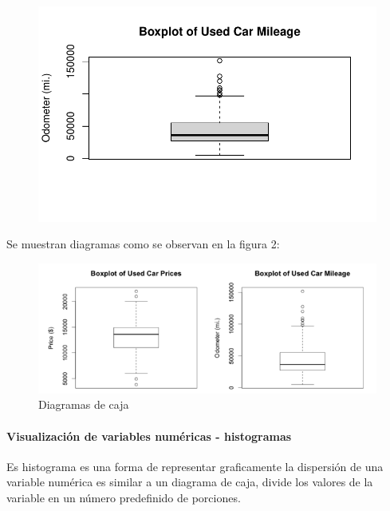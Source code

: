 \documentclass[
  letterpaper,
  DIV=11,
  numbers=noendperiod]{scrartcl}
\let\oldparagraph\paragraph
\renewcommand{\paragraph}[1]{\oldparagraph{#1}\mbox{}}
\begin{document}
\begin{figure}[H]

{\centering \includegraphics{Unidad1-resumen_files/figure-pdf/unnamed-chunk-54-2.pdf}

}

\end{figure}

Se muestran diagramas como se observan en la figura 2:

\begin{figure}

{\centering \includegraphics{Diagramas de caja.png}

}

\caption{Diagramas de caja}

\end{figure}

\hypertarget{visualizaciuxf3n-de-variables-numuxe9ricas---histogramas}{%
\paragraph{Visualización de variables numéricas -
histogramas}\label{visualizaciuxf3n-de-variables-numuxe9ricas---histogramas}}

Es histograma es una forma de representar graficamente la dispersión de
una variable numérica es similar a un diagrama de caja, divide los
valores de la variable en un número predefinido de porciones.
\end{document}
